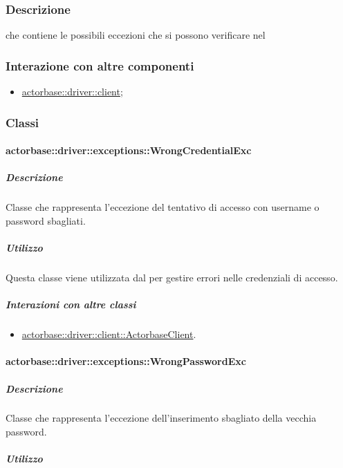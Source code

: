\documentclass{scalatekids-article}
\begin{document}
\subsubsection{Descrizione}

 che contiene le possibili eccezioni che si possono verificare nel 

\subsubsection{Interazione con altre componenti}
\begin{itemize}
\item \hyperref[sec:actorbase::driver::client]{actorbase::driver::client};
\end{itemize}

\subsubsection{Classi}

\paragraph{actorbase::driver::exceptions::WrongCredentialExc}

\subparagraph{Descrizione}

Classe che rappresenta l'eccezione del tentativo di accesso con username o password sbagliati.

\subparagraph{Utilizzo}

Questa classe viene utilizzata dal  per gestire errori nelle credenziali di accesso.

\subparagraph{Interazioni con altre classi}

\begin{itemize}
\item \hyperref[sec:actorbase::driver::client::ActorbaseClient]{actorbase::driver::client::ActorbaseClient}.
\end{itemize}

\paragraph{actorbase::driver::exceptions::WrongPasswordExc}

\subparagraph{Descrizione}

Classe che rappresenta l'eccezione dell'inserimento sbagliato della vecchia password.

\subparagraph{Utilizzo}
\end{document}
